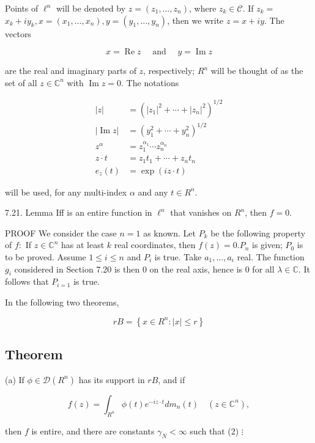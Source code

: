 \documentclass[10pt]{article}
\begin{document}
Points of $\ell^{n}$ will be denoted by $z=\left(z_{1}, \ldots, z_{n}\right)$, where $z_{k} \in \mathscr{C}$. If $z_{k}=$ $x_{k}+i y_{k}, x=\left(x_{1}, \ldots, x_{n}\right), y=\left(y_{1}, \ldots, y_{n}\right)$, then we write $z=x+i y$. The vectors

$$
x=\operatorname{Re} z \quad \text { and } \quad y=\operatorname{Im} z
$$

are the real and imaginary parts of $z$, respectively; $R^{n}$ will be thought of as the set of all $z \in \mathbb{C}^{n}$ with $\operatorname{Im} z=0$. The notations

$$
\begin{aligned}
|z| & =\left(\left|z_{1}\right|^{2}+\cdots+\left|z_{n}\right|^{2}\right)^{1 / 2} \\
|\operatorname{Im} z| & =\left(y_{1}^{2}+\cdots+y_{n}^{2}\right)^{1 / 2} \\
z^{\alpha} & =z_{1}^{\alpha_{1}} \cdots z_{n}^{\alpha_{n}} \\
z \cdot t & =z_{1} t_{1}+\cdots+z_{n} t_{n} \\
e_{z}(t) & =\exp (i z \cdot t)
\end{aligned}
$$

will be used, for any multi-index $\alpha$ and any $t \in R^{n}$.

7.21. Lemma Iff is an entire function in $\ell^{n}$ that vanishes on $R^{n}$, then $f=0$.

PROOF We consider the case $n=1$ as known. Let $P_{k}$ be the following property of $f:$ If $z \in \mathbb{C}^{n}$ has at least $k$ real coordinates, then $f(z)=0 . P_{n}$ is given; $P_{0}$ is to be proved. Assume $1 \leq i \leq n$ and $P_{i}$ is true. Take $a_{1}, \ldots, a_{i}$ real. The function $g_{i}$ considered in Section 7.20 is then 0 on the real axis, hence is 0 for all $\lambda \in \mathbb{C}$. It follows that $P_{i=1}$ is true.

In the following two theorems,

$$
r B=\left\{x \in R^{n}:|x| \leq r\right\}
$$

\subsection{Theorem}
(a) If $\phi \in \mathscr{D}\left(R^{n}\right)$ has its support in $r B$, and if

$$
f(z)=\int_{R^{n}} \phi(t) e^{-i z \cdot t} d m_{n}(t) \quad\left(z \in \mathbb{C}^{n}\right),
$$

then $f$ is entire, and there are constants $\gamma_{N}<\infty$ such that (2) $\vdots$
\end{document}

